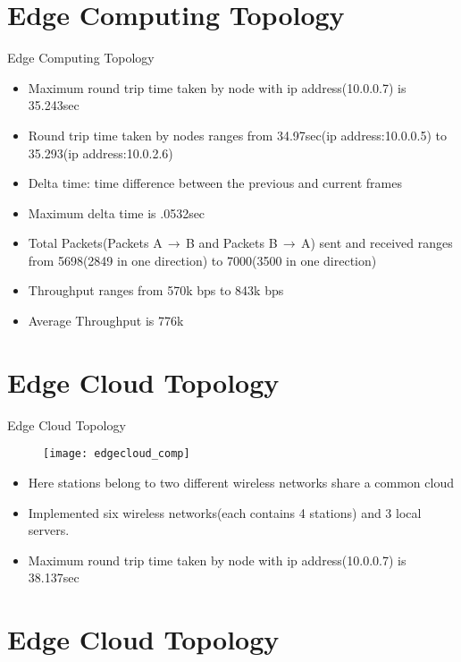 \documentclass{beamer}
\begin{document}
\section{Edge Computing Topology}

\begin{frame}{Edge Computing Topology}
\begin{itemize}
	\item Maximum round trip time taken by node with ip address(10.0.0.7) is 35.243sec
	\item Round trip time taken by nodes ranges from 34.97sec(ip address:10.0.0.5) to 35.293(ip address:10.0.2.6)
	\item Delta time: time difference between the previous and current frames
	\item Maximum delta time is .0532sec
	\item Total Packets(Packets A$\,\to\,$B and Packets B$\,\to\,$A) sent and received ranges from 5698(2849 in one direction) to 7000(3500 in one direction)
	\item Throughput ranges from 570k bps to 843k bps
	\item Average Throughput is 776k 
	

\end{itemize}
\end{frame}

\section{Edge Cloud Topology}

\begin{frame}{Edge Cloud Topology}
\begin{figure}
\texttt{[image: edgecloud\_comp]}
\centering
\end{figure}

\begin{itemize}
	\item Here stations belong to two different wireless networks share a common cloud
	\item Implemented six wireless networks(each contains 4 stations) and 3 local servers.
	\item Maximum round trip time taken by node with ip address(10.0.0.7) is 38.137sec

\end{itemize}

\end{frame}
\section{Edge Cloud Topology}
\end{document}
